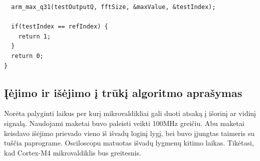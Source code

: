 \documentclass[a4paper, 12pt]{article} %
\begin{document}
\begin{onehalfspacing}
\begin{verbatim}
  arm_max_q31(testOutputQ, fftSize, &maxValue, &testIndex); 

  if(testIndex == refIndex) { 
    return 1;
  } 
  return 0;
}
\end{verbatim}
\subsection{\k{I}\.ejimo ir i\v{s}\.ejimo \k{i} tr\=uk\k{i} algoritmo apra\v{s}ymas}
Nor\.{e}ta palyginti laikus per kur\k{i} mikrovaldikliai gali duoti atsak\k{a} \k{i} i\v{s}orin\k{i} ar vidin\k{i} signal\k{a}. 
Naudojami maketai buvo paleisti veikti 100MHz grei\v{c}iu. Abu maketai keisdavo i\v{s}\.ejimo prievado vieno i\v{s} i\v{s}vad\k{u} login\k{i} lyg\k{i}, bei buvo \k{i}jungtas taimeris su tu\v{s}\v{c}ia paprograme. Osciloscopu matuotas i\v{s}vad\k{u} lygmen\k{u} kitimo laikas. Tik\.{e}tasi, kad Cortex-M4 mikrovaldiklis bus greitesnis.

\end{onehalfspacing}
\end{document}
